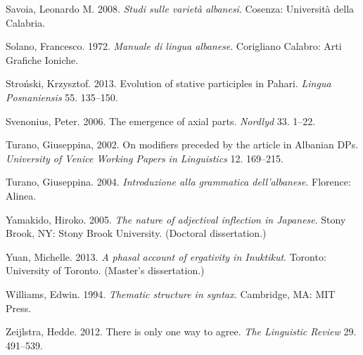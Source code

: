 \documentclass[output=paper]{langsci/langscibook}
\begin{document}
\begin{styleSfondomedioiColorexxi}
Savoia, Leonardo M. 2008. \textit{Studi sulle varietà albanesi}. Cosenza: Università della Calabria.
\end{styleSfondomedioiColorexxi}

\begin{styleSfondomedioiColorexxi}
Solano, Francesco. 1972. \textit{Manuale di lingua albanese}. Corigliano Calabro: Arti Grafiche Ioniche.
\end{styleSfondomedioiColorexxi}

\begin{styleSfondomedioiColorexxi}
Stroński, Krzysztof. 2013. Evolution of stative participles in Pahari. \textit{Lingua Posnaniensis} 55. 135–150.
\end{styleSfondomedioiColorexxi}

Svenonius, Peter. 2006. The emergence of axial parts. \textit{Nordlyd} 33. 1–22.

\begin{styleSfondomedioiColorexxi}
Turano, Giuseppina, 2002. On modifiers preceded by the article in Albanian DPs. \textit{University of Venice Working Papers in Linguistics} 12. 169–215. 
\end{styleSfondomedioiColorexxi}

\begin{styleSfondomedioiColorexi}
Turano, Giuseppina. 2004. \textit{Introduzione alla grammatica dell'albanese}. Florence: Alinea.
\end{styleSfondomedioiColorexi}

\begin{styleSfondomedioiColorexi}
Yamakido, Hiroko. 2005. \textit{The nature of adjectival inflection in Japanese}. Stony Brook, NY: Stony Brook University. (Doctoral dissertation.)
\end{styleSfondomedioiColorexi}

\begin{styleSfondomedioiColorexi}
Yuan, Michelle. 2013. \textit{A phasal account of ergativity in Inuktikut}. Toronto: University of Toronto. (Master’s dissertation.)
\end{styleSfondomedioiColorexi}

\begin{styleSfondomedioiColorexxi}
Williams, Edwin. 1994. \textit{Thematic structure in syntax.} Cambridge, MA: MIT Press.
\end{styleSfondomedioiColorexxi}

\begin{styleSfondomedioiColorexxi}
Zeijlstra, Hedde. 2012. There is only one way to agree. \textit{The Linguistic Review} 29. 491–539.
\end{styleSfondomedioiColorexxi}
\end{document}
